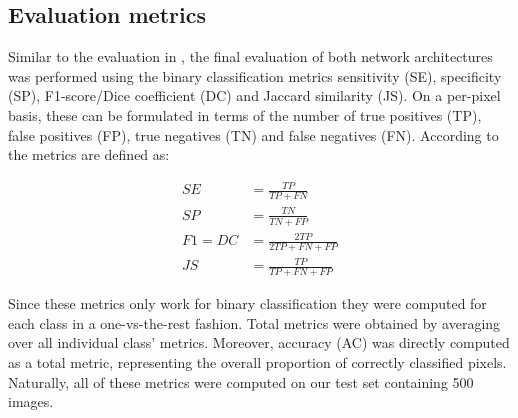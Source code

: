 \documentclass{article}
\begin{document}
\subsection{Evaluation metrics}
Similar to the evaluation in \autocite{R2UNet}, the final evaluation of both 
network architectures was performed using the binary classification metrics 
sensitivity (SE), specificity (SP), F1-score/Dice coefficient (DC) and Jaccard 
similarity (JS). On a per-pixel basis, these can be formulated in terms 
of the number of true positives (TP), false positives (FP), true negatives (TN) 
and false negatives (FN). According to \autocite[6]{R2UNet} 
\autocite{DiceJaccard} \autocite{SegMetrics} the metrics are defined as:

\begin{align}
	SE &= \frac{TP}{TP + FN}\\
	SP &= \frac{TN}{TN + FP}\\
	F1 = DC &= \frac{2TP}{2TP + FN + FP}\\
	JS &= \frac{TP}{TP + FN + FP}
\end{align}

Since these metrics only work for binary classification they were computed for 
each class in a one-vs-the-rest fashion. Total metrics were obtained by 
averaging 
over all individual class' metrics. Moreover, accuracy (AC) was directly 
computed as a total metric, representing the overall proportion of correctly 
classified pixels. Naturally, all of these metrics were computed on our test 
set containing 500 images.
\end{document}

